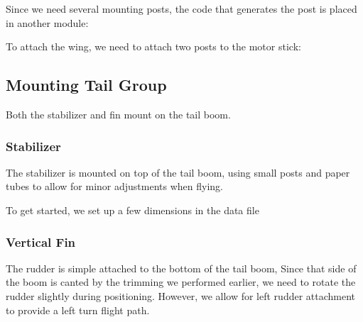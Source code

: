 Since we need several mounting posts, the code that generates the post is
placed in another module:

To attach the wing, we need to attach two posts to the motor stick:


\subsection*{Mounting Tail Group}

Both the stabilizer and fin mount on the tail boom.

\subsubsection*{Stabilizer}

The stabilizer is mounted on top of the tail boom, using small posts and paper
tubes to allow for minor adjustments when flying.

To get started, we set up a few dimensions in the data file

\subsubsection{Vertical Fin}

The rudder is simple attached to the bottom of the tail boom, Since that side
of the boom is canted by the trimming we performed earlier, we need to rotate
the rudder slightly during positioning.  However, we allow for  left rudder
attachment to provide a left turn flight path.

